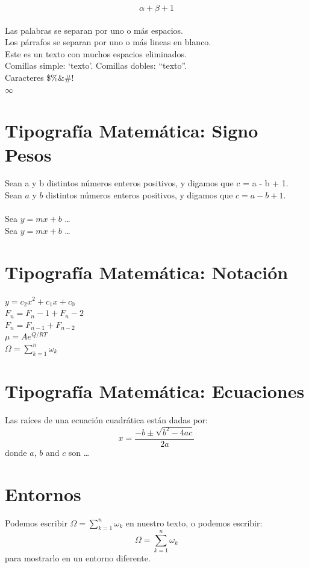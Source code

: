 \documentclass[10pt,a4paper]{article}
\begin{document}
\begin{equation}
\alpha + \beta + 1
\end{equation}
\\
Las palabras se separan por uno o m\'as espacios. \\
Los p\'arrafos se separan por uno o m\'as lineas en blanco. \\
Este    es    un    texto    con    muchos    espacios    eliminados.\\
Comillas simple: `texto'.
Comillas dobles: ``texto''. \\
Caracteres \$\%\&\#! \\
$\infty$    %

\section*{Tipografía Matemática: Signo Pesos}
Sean a y b distintos n\'umeros
enteros positivos, y digamos
que c = a - b + 1. \\
Sean $a$ y $b$ distintos n\'umeros
enteros positivos, y digamos
que $c = a - b + 1$. \\
\\
Sea $y=mx+b$ \ldots \\
Sea $y = m x + b$ \ldots %
\\

\section*{Tipografía Matemática: Notación}
$y = c_2 x^2 + c_1 x + c_0$ \\
$F_n = F_n-1 + F_n-2$ \\ %
$F_n = F_{n-1} + F_{n-2}$ \\ %
$\mu = A e^{Q/RT}$ \\
$\Omega = \sum_{k=1}^{n} \omega_k$ \\

\section*{Tipografía Matemática: Ecuaciones}
Las ra\'ices de una ecuaci\'on cuadr\'atica est\'an dadas por:
\begin{equation}
x = \frac{-b \pm \sqrt{b^2 - 4ac}}
{2a}
\end{equation}
donde $a$, $b$ and $c$ son \ldots

\section*{Entornos}
Podemos escribir $ \Omega = \sum_{k=1}^{n} \omega_k $ en nuestro texto, o podemos escribir:
\begin{equation}
\Omega = \sum_{k=1}^{n} \omega_k
\end{equation}
para mostrarlo en un entorno diferente.
\end{document}
